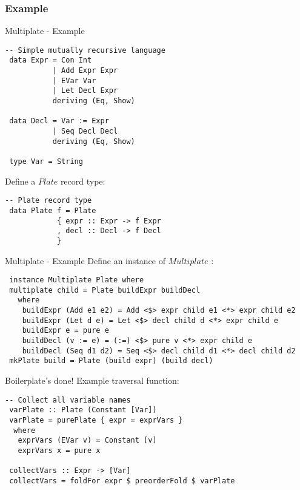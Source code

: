 \documentclass[10pt]{beamer}
\begin{document}
\subsubsection*{Example}
\begin{frame}[fragile]{Multiplate - Example}

\begin{lstlisting}
-- Simple mutually recursive language
 data Expr = Con Int
           | Add Expr Expr
           | EVar Var
           | Let Decl Expr
           deriving (Eq, Show)
 
 data Decl = Var := Expr
           | Seq Decl Decl
           deriving (Eq, Show)
 
 type Var = String
\end{lstlisting}

Define a $ Plate $ record type:
\begin{lstlisting}
-- Plate record type
 data Plate f = Plate
            { expr :: Expr -> f Expr
            , decl :: Decl -> f Decl
            }
\end{lstlisting}

\end{frame}


\begin{frame}[fragile]{Multiplate - Example}
Define an instance of $ Multiplate $ :
\begin{lstlisting}
 instance Multiplate Plate where
 multiplate child = Plate buildExpr buildDecl
   where
    buildExpr (Add e1 e2) = Add <$> expr child e1 <*> expr child e2
    buildExpr (Let d e) = Let <$> decl child d <*> expr child e
    buildExpr e = pure e
    buildDecl (v := e) = (:=) <$> pure v <*> expr child e
    buildDecl (Seq d1 d2) = Seq <$> decl child d1 <*> decl child d2
 mkPlate build = Plate (build expr) (build decl)
\end{lstlisting}

Boilerplate's done! Example traversal function:

\begin{lstlisting}
-- Collect all variable names
 varPlate :: Plate (Constant [Var])
 varPlate = purePlate { expr = exprVars }
  where
   exprVars (EVar v) = Constant [v]
   exprVars x = pure x
   
 collectVars :: Expr -> [Var]
 collectVars = foldFor expr $ preorderFold $ varPlate
\end{lstlisting}

\end{frame}
\end{document}
